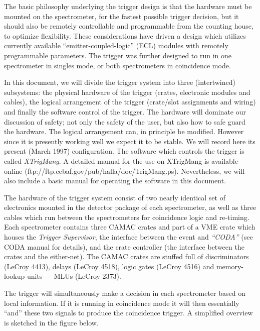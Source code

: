 

	The basic philosophy underlying the trigger design is that the hardware must be mounted on the spectrometer, for the fastest possible trigger decision,  but it should also be remotely controllable and programmable from the counting house, to optimize flexibility.  These considerations have driven a design which utilizes currently available ``emitter-coupled-logic'' (ECL) modules with remotely programmable parameters. The trigger was further designed to run in one spectrometer in singles mode,  or both spectrometers in coincidence mode.  

	In this document, we will divide the trigger system into three (intertwined) subsystems: the physical hardware of the trigger (crates, electronic modules and cables), the logical arrangement of the trigger (crate/slot assignments and wiring) and finally the software control of the trigger.  The hardware will dominate our discussion of safety; not only the safety of the user, but also how to safe guard the hardware.  The logical arrangement can, in principle be modified.  However since it is presently working well we expect it to be stable.  We will record here its present (March 1997) configuration. The software which controls the trigger is called {\sl XTrigMang}.  A detailed manual for the use on XTrigMang is available online (ftp://ftp.cebaf.gov/pub/halla/doc/TrigMang.ps). Nevertheless, we will also include a basic manual for operating the software in this document.

	The hardware of the trigger system consist of two nearly identical set of electronics mounted in the detector package of each spectrometer, as well as three cables which run between the spectrometers for coincidence logic and re-timing.  Each spectrometer contains three CAMAC crates and part of a VME crate which houses the 
{\sl Trigger Supervisor}, the interface between the event and {\sl ``CODA''} (see CODA manual for details), and the crate controller (the interface between the crates and the either-net).  The CAMAC crates  are stuffed full of discriminators (LeCroy 4413), delays (LeCroy 4518), logic gates (LeCroy 4516) and memory-lookup-units  --- MLUs  (LeCroy 2373).

	The trigger will simultaneously make a decision in each spectrometer based on local information.  If it is running in coincidence mode it will then essentially ``and'' these two signals to produce the coincidence trigger.  A simplified overview is sketched in the figure below.

